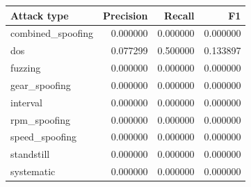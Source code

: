\begin{tabular}{lrrr}
\toprule
Attack type & Precision & Recall & F1 \\
\midrule
combined_spoofing & 0.000000 & 0.000000 & 0.000000 \\
dos & 0.077299 & 0.500000 & 0.133897 \\
fuzzing & 0.000000 & 0.000000 & 0.000000 \\
gear_spoofing & 0.000000 & 0.000000 & 0.000000 \\
interval & 0.000000 & 0.000000 & 0.000000 \\
rpm_spoofing & 0.000000 & 0.000000 & 0.000000 \\
speed_spoofing & 0.000000 & 0.000000 & 0.000000 \\
standstill & 0.000000 & 0.000000 & 0.000000 \\
systematic & 0.000000 & 0.000000 & 0.000000 \\
\bottomrule
\end{tabular}
